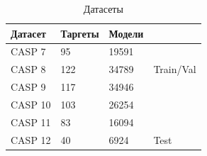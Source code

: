 \documentclass[12pt,twosides]{article}
\begin{document}
\begin{table}[H]
	\begin{minipage}{0.5\linewidth}
		\centering
		\begin{tabular}{l|ll|l}
			\hline Датасет & Таргеты & Модели &  \\
			\hline CASP 7 & 95 & 19591 & \\
			CASP 8 & 122 & 34789 &  { Train/Val } \\
			CASP 9 & 117 & 34946 & \\
			CASP 10 & 103 & 26254 & \\
			\hline 
			CASP 11 & 83 & 16094 & \\
			CASP 12 & 40 & 6924 & Test \\
			\hline
		\end{tabular}
		\caption{Датасеты}
		\label{table:student}
	\end{minipage}\hfill
	\begin{minipage}{0.45\linewidth}
		\centering
		\subfloat[True]{\label{fig:edge-b}
}
\end{minipage}
\end{table}
\end{document}
